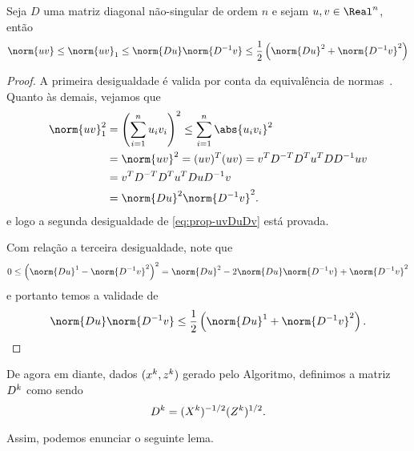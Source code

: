 \begin{prop}\label{prop:norm-uv}
	Seja $D$ uma matriz diagonal não-singular de ordem $n$ e sejam $u,v\in\Real^n$, então 
	\begin{equation}
		\label{eq:prop-uvDuDv}
		\norm{uv}\leq \norm{uv}_1 \leq \norm{Du}\norm{D^{-1}v} \leq \frac{1}{2}\left(\norm{Du}^{2} + \norm{D^{-1}v}^{2}\right)
	\end{equation}
\end{prop}
\begin{proof} A primeira desigualdade é valida por conta da equivalência de normas~\cite{Golub:1996wp}. Quanto às demais, vejamos que 
	\begin{align*}
		\norm{uv}_1^{2} & = \left( \sum_{i=1}^{n}u_i v_i  \right)^{2} \leq  \sum_{i=1}^{n}\abs{u_iv_i}^{2}\\
						& = \norm{uv}^{2} = (uv)^{T}(uv)  = v^{T}D^{-T}D^{T}u^{T}DD^{-1} uv\\
						& = v^{T}D^{-T}D^{T}u^{T}DuD^{-1}v\\
						& = \norm{Du}^{2}\norm{D^{-1}v}^{2}.
	\end{align*}
e logo a segunda desigualdade de \eqref{eq:prop-uvDuDv} está provada. 

Com relação a terceira desigualdade, note que  
\[
0 \leq \left(\norm{Du}^{1} - \norm{D^{-1}v}^{2}\right)^{2} = \norm{Du}^{2} - 2\norm{Du}\norm{D^{-1}v} + \norm{D^{-1}v}^{2}
\]
e portanto temos a validade de
\[
\norm{Du}\norm{D^{-1}v} \leq \frac{1}{2}\left(\norm{Du}^{1} + \norm{D^{-1}v}^{2}\right). \qedhere
\]
\end{proof}

De agora em diante, dados $(x^{k},z^{k})$ gerado pelo Algoritmo, definimos a matriz $D^{k}$ como sendo
\[
D^{k} =(X^{k})^{-1/2}(Z^{k})^{1/2}.
\]

Assim, podemos enunciar o seguinte lema.

